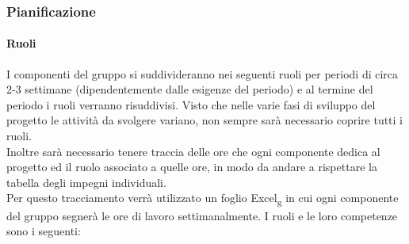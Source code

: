 \subsubsection{Pianificazione}

\paragraph{Ruoli}
I componenti del gruppo si suddivideranno nei seguenti ruoli per periodi di circa 2-3 settimane (dipendentemente dalle esigenze del periodo) e al termine del periodo i ruoli verranno risuddivisi. 
Visto che nelle varie fasi di sviluppo del progetto le attività da svolgere variano, non sempre sarà necessario coprire tutti i ruoli.\\
Inoltre sarà necessario tenere traccia delle ore che ogni componente dedica al progetto ed il ruolo associato a quelle ore, in modo da andare a rispettare la tabella degli impegni individuali.\\
Per questo tracciamento verrà utilizzato un foglio Excel\textsubscript{g} in cui ogni componente del gruppo segnerà le ore di lavoro settimanalmente.
I ruoli e le loro competenze sono i seguenti:

